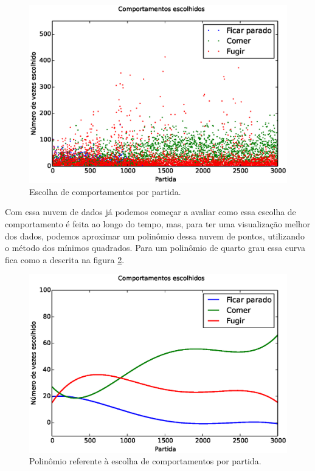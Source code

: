 \begin{figure}[H]
    \centering
    \includegraphics[width=\linewidth]{images/3_behaviors_small_map/chosen_behaviors}
    \caption{Escolha de comportamentos por partida.}
    \label{img:3ComportamentosMapaPequeno:ComportamentosEscolhidos}
\end{figure}

Com essa nuvem de dados já podemos começar a avaliar como essa escolha de comportamento é feita ao longo do tempo, mas, para ter uma visualização melhor dos dados, podemos aproximar um polinômio dessa nuvem de pontos, utilizando o método dos mínimos quadrados. Para um polinômio de quarto grau essa curva fica como a descrita na figura \ref{img:3ComportamentosMapaPequeno:ComportamentosEscolhidosPolinômio}.

\begin{figure}[H]
    \centering
    \includegraphics[width=\linewidth]{images/3_behaviors_small_map/chosen_behaviors_pol}
    \caption{Polinômio referente à escolha de comportamentos por partida.}
    \label{img:3ComportamentosMapaPequeno:ComportamentosEscolhidosPolinômio}
\end{figure}

